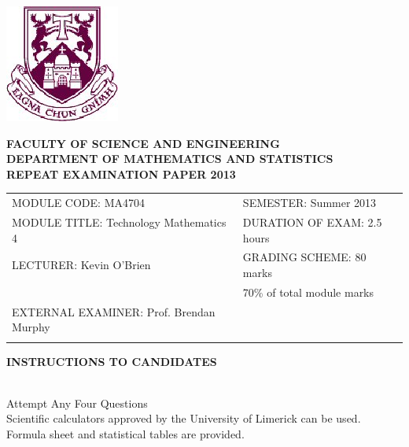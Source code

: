 \documentclass{article}
\begin{document}
\begin{center}
       \includegraphics[scale=0.55]{shieldtransparent2}
\end{center}

\begin{center}
\vspace{1cm}
\large \bf {FACULTY OF SCIENCE AND ENGINEERING} \\[0.5cm]
\normalsize DEPARTMENT OF MATHEMATICS AND STATISTICS \\[1.25cm]
\large \bf {REPEAT EXAMINATION PAPER 2013} \\[1.5cm]
\end{center}

\begin{tabular}{ll}
MODULE CODE: MA4704 & SEMESTER: Summer 2013 \\[1cm]
MODULE TITLE: Technology Mathematics 4 & DURATION OF EXAM: 2.5 hours \\[1cm]
LECTURER: Kevin O'Brien & GRADING SCHEME: 80 marks\\
 & \phantom{GRADING SCHEME:} \footnotesize {70\% of total module marks}   \\[0.8cm]
EXTERNAL EXAMINER: Prof. Brendan Murphy & \\[1cm]
\\[1cm]
\end{tabular}
\begin{center}
{\bf INSTRUCTIONS TO CANDIDATES}
\end{center}

{\noindent \\ Attempt Any Four Questions
\\ Scientific calculators approved by the University of Limerick can be used. 
\\ Formula sheet and statistical tables are provided.
}
\end{document}
